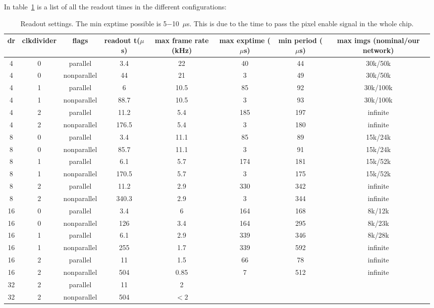 \documentclass{article}
\begin{document}
In table~\ref{tframes} is a list of all the readout times in the different configurations:
\begin{tiny}
\begin{table}
\begin{flushleft}
\begin{tabular}{|c|c|c|c|c|c|c|c|}
\hline
\tiny{dr} & \tiny{clkdivider} & \tiny{flags} & \tiny{readout t($\mu$s)} & \tiny{max frame rate (kHz)} & \tiny{max exptime ($\mu$s)} & \tiny{min period ($\mu$s)} & \tiny{max imgs (nominal/our network)}\\
\hline
4 & 0 & parallel & 3.4 & 22 &  40 & 44 & 30k/50k\\
\hline
4 & 0 & nonparallel & 44 & 21 &  3 & 49 & 30k/50k\\
\hline
4 & 1 & parallel & 6 & 10.5 &  85 & 92 & 30k/100k\\
\hline
4 & 1 & nonparallel & 88.7 & 10.5 & 3 & 93 & 30k/100k\\
\hline
4 & 2 & parallel & 11.2 & 5.4 &  185 & 197 & infinite\\
\hline
4 & 2 & nonparallel & 176.5 & 5.4 &  3 & 180 & infinite\\
\hline
\hline
8 & 0 & parallel & 3.4 & 11.1 &  85 & 89 & 15k/24k\\
\hline
8 & 0 & nonparallel & 85.7 & 11.1 & 3 & 91 & 15k/24k\\
\hline
8 & 1 & parallel & 6.1 & 5.7 &  174 & 181 & 15k/52k\\
\hline
8 & 1 & nonparallel & 170.5 & 5.7 &  3 & 175 & 15k/52k\\
\hline
8 & 2 & parallel & 11.2 &  2.9 &  330 & 342 & infinite\\
\hline
8 & 2 & nonparallel & 340.3 &  2.9 &  3 & 344 & infinite\\
\hline
\hline
16 & 0 & parallel & 3.4 & 6 & 164 & 168 & 8k/12k\\
\hline
16 & 0 & nonparallel &  126 & 3.4& 164 & 295 & 8k/23k\\
\hline
16 & 1 & parallel &  6.1 & 2.9&  339 & 346 & 8k/28k\\
\hline
16 & 1 & nonparallel & 255 & 1.7&  339 & 592 & infinite\\
\hline
16 & 2 & parallel &  11 & 1.5& 66 & 78 & infinite \\
\hline
16 & 2 & nonparallel & 504 & 0.85 & 7 & 512 & infinite\\
\hline
\hline
32 & 2 & parallel &  11 & 2&  & &\\
\hline
32 & 2 & nonparallel & 504 & $<2$&  & &\\
\hline
\end{tabular}
\caption{Readout settings. The {\tiny{min exptime}} possible is 5$-$10~$\mu$s. This is due to the time to pass the pixel enable signal in the whole chip.}
\label{tframes}
\end{flushleft}
\end{table}
\end{tiny}
\end{document}
